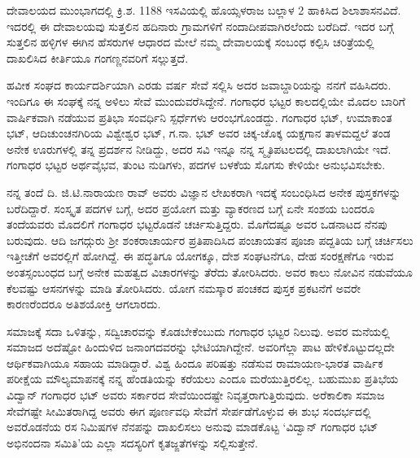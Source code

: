 ದೇವಾಲಯದ ಮುಂಭಾಗದಲ್ಲಿ ಕ್ರಿ.ಶ. 1188 ಇಸವಿಯಲ್ಲಿ ಹೊಯ್ಸಳರಾಜ ಬಲ್ಲಾಳ 2 ಹಾಕಿಸಿದ ಶಿಲಾಶಾಸನವಿದೆ. ಇದರಲ್ಲಿ ಈ ದೇವಾಲಯವು ಸುತ್ತಲಿನ ಹದಿನಾರು ಗ್ರಾಮಗಳಿಗೆ ನಂದಾದೀಪವಾಗಿರಲೆಂದು ಬರೆದಿದೆ. ಇದರ ಬಗ್ಗೆ ಸುತ್ತಲಿನ ಹಳ್ಳಿಗಳ ಈಗಿನ ಹೆಸರುಗಳ ಆಧಾರದ ಮೇಲೆ ನಮ್ಮ ದೇವಾಲಯಕ್ಕೆ ಸಂಬಂಧ ಕಲ್ಪಿಸಿ ಚರಿತ್ರೆಯಲ್ಲಿ ದಾಖಲಿಸಿದ ಕೀರ್ತಿಯೂ ಗಂಗಣ್ಣನವರಿಗೆ ಸಲ್ಲುತ್ತದೆ.

ಹವೀಕ ಸಂಘದ ಕಾರ್ಯದರ್ಶಿಯಾಗಿ ಎರಡು ವರ್ಷ ಸೇವೆ ಸಲ್ಲಿಸಿ ಅದರ ಜವಾಬ್ದಾರಿಯನ್ನು ನನಗೆ ವಹಿಸಿದರು. ಇಂದಿಗೂ ಈ ಸಂಘಕ್ಕೆ ನನ್ನ ಅಳಿಲು ಸೇವೆ ಮುಂದುವರೆಸಿದ್ದೇನೆ. ಗಂಗಾಧರ ಭಟ್ಟರ ಕಾಲದಲ್ಲಿಯೇ ಮೊದಲ ಬಾರಿಗೆ ವಾರ್ಷಿಕವಾಗಿ ನಡೆಯುವ ಪ್ರತಿಭಾ ಸಂವರ್ಧಿನಿ ಸ್ಪರ್ಧೆಗಳು ಆರಂಭಗೊಂಡದ್ದು. ಗಂಗಾಧರ ಭಟ್, ಉಮಾಕಾಂತ ಭಟ್, ಆದಿಚುಂಚನಗಿರಿಯ ವಿಶ್ವೇಶ್ವರ ಭಟ್, ಗ.ನಾ. ಭಟ್ ಅವರ ಚಿಕ್ಕ-ಚೊಕ್ಕ ಯಕ್ಷಗಾನ ತಾಳಮದ್ದಲೆ ತಂಡ ಅನೇಕ ಊರುಗಳಲ್ಲಿ ತನ್ನ ಪ್ರದರ್ಶನ ನೀಡಿದ್ದು, ಅದರ ಸವಿ ಇನ್ನೂ ನನ್ನ ಸ್ಮೃತಿಪಟಲದಲ್ಲಿ ದಾಖಲಾಗಿಯೇ ಇದೆ. ಗಂಗಾಧರ ಭಟ್ಟರ ಅರ್ಥವೈಭವ, ತುಂಟ ನುಡಿಗಳು, ಪದಗಳ ಬಳಕೆಯ ಸೊಗಸು ಕೇಳಿಯೇ ಅನುಭವಿಸಬೇಕು.

ನನ್ನ ತಂದೆ ದಿ. ಜಿ.ಟಿ.ನಾರಾಯಣ ರಾವ್ ಅವರು ವಿಜ್ಞಾನ ಲೇಖಕರಾಗಿ ಇದಕ್ಕೆ ಸಂಬಂಧಿಸಿದ ಅನೇಕ ಪುಸ್ತಕಗಳನ್ನು ಬರೆದಿದ್ದಾರೆ. ಸಂಸ್ಕೃತ ಪದಗಳ ಬಗ್ಗೆ, ಅದರ ಪ್ರಯೋಗ ಮತ್ತು ವ್ಯಾಕರಣದ ಬಗ್ಗೆ ಏನೇ ಸಂಶಯ ಬಂದರೂ ತಂದೆಯವರು ಮೊದಲಿಗೆ ಗಂಗಾಧರ ಭಟ್ಟರೊಡನೆ ಚರ್ಚಿಸುತ್ತಿದ್ದರು. ಮೊಗೆದಷ್ಟೂ ಅವರ ಒಡನಾಟದ ನೆನಪು ಬರುವುದು. ಆದಿ ಜಗದ್ಗುರು ಶ್ರೀ ಶಂಕರಾಚಾರ್ಯರ ಪ್ರತಿಪಾದಿಸಿದ ಪಂಚಾಯತನ ಪೂಜಾ ಪದ್ದತಿಯ ಬಗ್ಗೆ ಚರ್ಚಿಸಲು ಇತ್ತೀಚೆಗೆ ಅವರಲ್ಲಿಗೆ ಹೋಗಿದ್ದೆ. ಈ ಪದ್ಧತಿಗೂ ಯೋಗಕ್ಕೂ, ದೇಶ ಸಂಘಟನೆಗೂ, ದೇಹ ಸಂರಕ್ಷಣೆಗೂ ಇರುವ ಅಂತಸ್ಸಂಬಂಧದ ಬಗ್ಗೆ ಅನೇಕ ಮಹತ್ವದ ವಿಚಾರಗಳನ್ನು ತೆರೆದು ತೋರಿಸಿದರು. ಅವರ ಕಾಲು ನೋವಿನ ನಡುವೆಯೂ ಕೆಲವಷ್ಟು ಆಸನಗಳನ್ನು ಮಾಡಿ ತೋರಿಸಿದರು. ಯೋಗ ನಮಸ್ಕಾರ ಪಂಚಕದ ಪುಸ್ತಕ ಪ್ರಕಟನೆಗೆ ಅವರೇ ಕಾರಣರೆಂದರೂ ಅತಿಶಯೋಕ್ತಿ ಆಗಲಾರದು. 

ಸಮಾಜಕ್ಕೆ ಸದಾ ಒಳಿತನ್ನು, ಸದ್ವಿಚಾರವನ್ನು ಕೊಡಬೇಕೆಂಬುದು ಗಂಗಾಧರ ಭಟ್ಟರ ನಿಲುವು. ಅವರ ಮನೆಯಲ್ಲಿ ಸಮಾಜದ ಅದೆಷ್ಟೋ ಹಿಂದುಳಿದ ಜನಾಂಗದವರನ್ನು ಭೇಟಿಯಾಗಿದ್ದೇನೆ. ಅವರಿಗೆಲ್ಲಾ ಪಾಟ ಹೇಳಿಕೊಟ್ಟುದಲ್ಲದೇ  ಆರ್ಥಿಕವಾಗಿಯೂ ಸಹಾಯ ಮಾಡಿದ್ದಾರೆ. ವಿಶ್ವ ಹಿಂದೂ ಪರಿಷತ್ತು ನಡೆಸುವ ರಾಮಾಯಣ-ಭಾರತ ವಾರ್ಷಿಕ ಪರೀಕ್ಷೆಯ ಮೌಲ್ಯಮಾಪನಕ್ಕೆ ನನ್ನ ಹೆಂಡತಿಯನ್ನು ಕರೆಯಲು ಎಂದೂ ಮರೆಯುತ್ತಿರಲಿಲ್ಲ.   ಬಹುಮುಖ ಪ್ರತಿಭೆಯ ವಿದ್ವಾನ್ ಗಂಗಾಧರ ಭಟ್ ಅವರು ಸರ್ಕಾರದ ಸೇವೆಯಿಂದಷ್ಟೇ ನಿವೃತ್ತರಾಗುತ್ತಿರುವುದು. ಅರೆಕಾಲಿಕಾ ಸಮಾಜ ಸೇವೆಗಷ್ಟೇ ಸೀಮಿತರಾಗಿದ್ದ ಅವರು ಈಗ ಪೂರ್ಣವಧಿ ಸೇವೆಗೆ ಸೇರ್ಪಡೆಗೊಳ್ಳುವ ಈ ಶುಭ ಸಂದರ್ಭದಲ್ಲಿ ಅವರೊಡನೆಯ ರಸ ನಿಮಿಷಗಳ ನೆನಪನ್ನು ದಾಖಲಿಸಲು ಅನುವು ಮಾಡಕೊಟ್ಟ ‘ವಿದ್ವಾನ್ ಗಂಗಾಧರ ಭಟ್ ಅಭಿನಂದನಾ ಸಮಿತಿ’ಯ ಎಲ್ಲಾ ಸದಸ್ಯರಿಗೆ ಕೃತಜ್ಙತೆಗಳನ್ನು ಸಲ್ಲಿಸುತ್ತೇನೆ.                 

